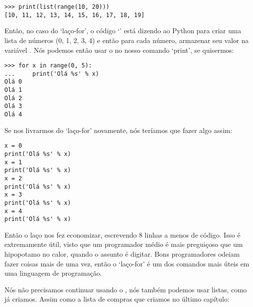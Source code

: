 \begin{listing}
\begin{verbatim}
>>> print(list(range(10, 20)))
[10, 11, 12, 13, 14, 15, 16, 17, 18, 19]
\end{verbatim}
\end{listing}

Então, no caso do `laço-for', o código `' está dizendo ao Python para criar uma lista de números (0, 1, 2, 3, 4) e então para cada número, armazenar seu valor na variável . Nós podemos então usar o  no nosso comando `print', se quisermos:

\begin{listing}
\begin{verbatim}
>>> for x in range(0, 5):
...     print('Olá %s' % x)
Olá 0
Olá 1
Olá 2
Olá 3
Olá 4
\end{verbatim}
\end{listing}

Se nos livrarmos do `laço-for' novamente, nós teríamos que fazer algo assim:

\begin{listing}
\begin{verbatim}
x = 0
print('Olá %s' % x)
x = 1
print('Olá %s' % x)
x = 2
print('Olá %s' % x)
x = 3
print('Olá %s' % x)
x = 4
print('Olá %s' % x)
\end{verbatim}
\end{listing}

Então o laço nos fez economizar, escrevendo 8 linhas a menos de código. Isso é extremamente útil, visto que um programador médio é mais preguiçoso que um hipopotamo no calor, quando o assunto é digitar. Bons programadores odeiam fazer coisas mais de uma vez, então o `laço-for' é um dos comandos mais úteis em uma linguagem de programação.

\linebreak
\par
Nós não precisamos continuar usando o , nós também podemos usar listas, como já criamos. Assim como a lista de compras que criamos no último capítulo:

